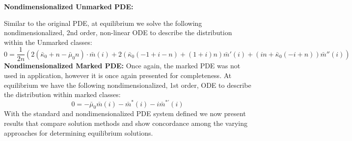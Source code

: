 \documentclass[review]{elsarticle}
\begin{document}
\textbf{Nondimensionalized Unmarked PDE:}

Similar to the original PDE, at equilibrium we solve the following nondimensionalized, 2nd order,
non-linear ODE to describe the distribution within the Unmarked classes:
\begin{equation*}
0=\frac{1}{2n} (2(\bar{\kappa}_0+n -\bar{\mu}_0 n)\cdot \bar{m}(i)+2(\bar{\kappa}_0(-1+i-n)+(1+i)n)\bar{m}'(i)+(in+\bar{\kappa}_0 (-i+n))\bar{m}''(i))
\end{equation*}
\textbf{Nondimensionalized Marked PDE:}
Once again, the marked PDE was not used in application, however it is once again presented for completeness.
At equilibrium we have the following nondimensionalized, 1st order, ODE to describe the distribution within marked classes:
\begin{equation*}
0=-\bar{\mu}_0 \bar{m}(i)-\bar{m}^{*}(i)-i\bar{m}^{*\prime}(i)
\end{equation*}
With the standard and nondimensionalized PDE system defined we now present results that compare solution methods and show concordance among the varying approaches for determining equilibrium solutions.
\end{document}
